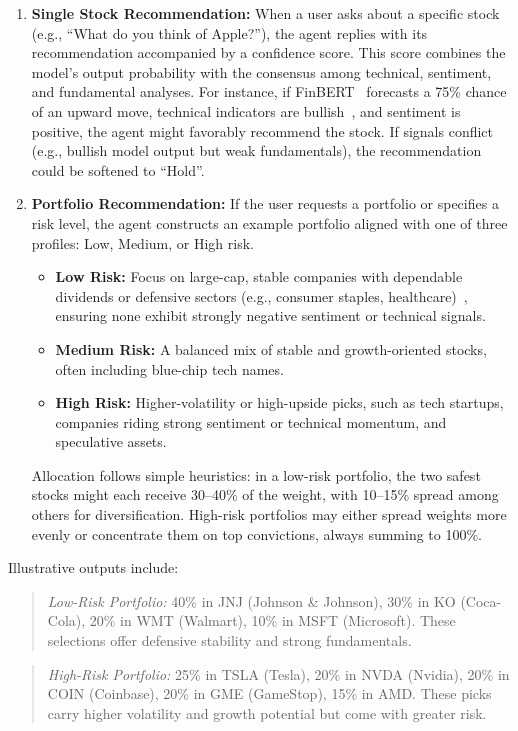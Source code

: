 \documentclass[conference]{IEEEtran}
\begin{document}
\begin{enumerate}
    \item \textbf{Single Stock Recommendation:} When a user asks about a specific stock (e.g., ``What do you think of Apple?''), the agent replies with its recommendation accompanied by a confidence score. This score combines the model’s output probability with the consensus among technical, sentiment, and fundamental analyses. For instance, if FinBERT~\cite{b3} forecasts a 75\% chance of an upward move, technical indicators are bullish~\cite{hossain2019}, and sentiment is positive, the agent might favorably recommend the stock. If signals conflict (e.g., bullish model output but weak fundamentals), the recommendation could be softened to ``Hold''.
    
    \item \textbf{Portfolio Recommendation:} If the user requests a portfolio or specifies a risk level, the agent constructs an example portfolio aligned with one of three profiles: Low, Medium, or High risk.
    
    \begin{itemize}
        \item \textbf{Low Risk:} Focus on large-cap, stable companies with dependable dividends or defensive sectors (e.g., consumer staples, healthcare)~\cite{alobaidi2022}, ensuring none exhibit strongly negative sentiment or technical signals.
        \item \textbf{Medium Risk:} A balanced mix of stable and growth-oriented stocks, often including blue-chip tech names.
        \item \textbf{High Risk:} Higher-volatility or high-upside picks, such as tech startups, companies riding strong sentiment or technical momentum, and speculative assets.
    \end{itemize}
    
    Allocation follows simple heuristics: in a low-risk portfolio, the two safest stocks might each receive 30--40\% of the weight, with 10--15\% spread among others for diversification. High-risk portfolios may either spread weights more evenly or concentrate them on top convictions, always summing to 100\%.
\end{enumerate}

Illustrative outputs include:
\begin{quote}
\textit{Low-Risk Portfolio:} 40\% in JNJ (Johnson \& Johnson), 30\% in KO (Coca-Cola), 20\% in WMT (Walmart), 10\% in MSFT (Microsoft). These selections offer defensive stability and strong fundamentals.
\end{quote}
\begin{quote}
\textit{High-Risk Portfolio:} 25\% in TSLA (Tesla), 20\% in NVDA (Nvidia), 20\% in COIN (Coinbase), 20\% in GME (GameStop), 15\% in AMD. These picks carry higher volatility and growth potential but come with greater risk.
\end{quote}
\end{document}
